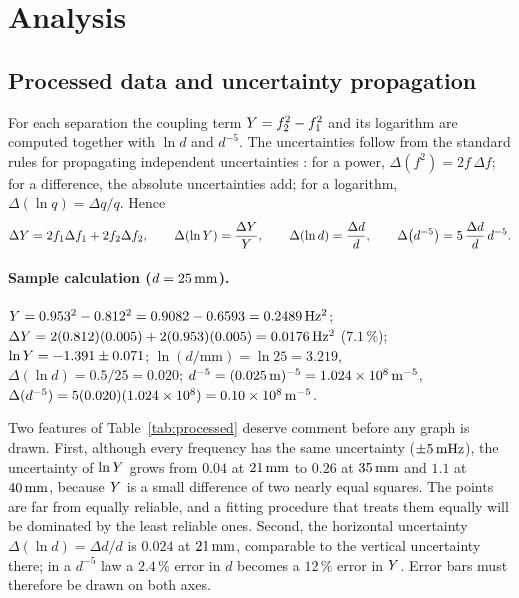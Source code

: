 \section{Analysis}\label{sec:analysis}

\subsection{Processed data and uncertainty propagation}

For each separation the coupling term $Y=f_2^2-f_1^2$ and its logarithm are computed together with $\ln d$ and $d^{-5}$. The uncertainties follow from the standard rules for propagating independent uncertainties \cite{taylorerr}: for a power, $\Delta(f^2)=2f\,\Delta f$; for a difference, the absolute uncertainties add; for a logarithm, $\Delta(\ln q)=\Delta q/q$. Hence
\begin{equation}
\Delta Y=2f_1\Delta f_1+2f_2\Delta f_2,\qquad
\Delta(\ln Y)=\frac{\Delta Y}{Y},\qquad
\Delta(\ln d)=\frac{\Delta d}{d},\qquad
\Delta\big(d^{-5}\big)=5\,\frac{\Delta d}{d}\,d^{-5}.
\label{eq:unc}
\end{equation}

\paragraph{Sample calculation ($d=25\,\mathrm{mm}$).}
$Y=0.953^2-0.812^2=0.9082-0.6593=0.2489\,\mathrm{Hz^2}$;\;
$\Delta Y=2(0.812)(0.005)+2(0.953)(0.005)=0.0176\,\mathrm{Hz^2}$ ($7.1\,\%$);\;
$\ln Y=-1.391\pm0.071$;\;
$\ln(d/\mathrm{mm})=\ln25=3.219$, $\Delta(\ln d)=0.5/25=0.020$;\;
$d^{-5}=(0.025\,\mathrm{m})^{-5}=1.024\times10^{8}\,\mathrm{m^{-5}}$, $\Delta(d^{-5})=5(0.020)(1.024\times10^8)=0.10\times10^8\,\mathrm{m^{-5}}$.

Two features of Table~\ref{tab:processed} deserve comment before any graph is drawn. First, although every frequency has the same uncertainty ($\pm5\,\mathrm{mHz}$), the uncertainty of $\ln Y$ grows from $0.04$ at $21\,\mathrm{mm}$ to $0.26$ at $35\,\mathrm{mm}$ and $1.1$ at $40\,\mathrm{mm}$, because $Y$ is a small difference of two nearly equal squares. The points are far from equally reliable, and a fitting procedure that treats them equally will be dominated by the least reliable ones. Second, the horizontal uncertainty $\Delta(\ln d)=\Delta d/d$ is $0.024$ at $21\,\mathrm{mm}$, comparable to the vertical uncertainty there; in a $d^{-5}$ law a $2.4\,\%$ error in $d$ becomes a $12\,\%$ error in $Y$. Error bars must therefore be drawn on both axes.

